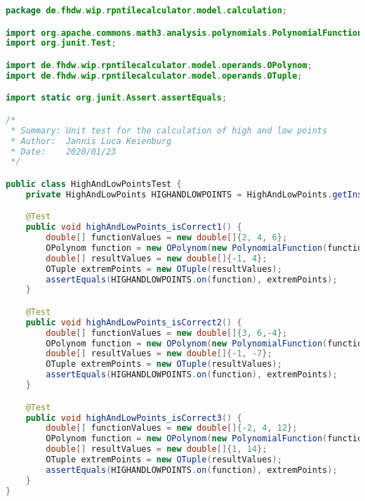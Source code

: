 \begin{lstlisting}[caption=HighAndLowPointsTest (Keienburg),label=list:HighAndLowPointsTest,language=Java]
package de.fhdw.wip.rpntilecalculator.model.calculation;

import org.apache.commons.math3.analysis.polynomials.PolynomialFunction;
import org.junit.Test;

import de.fhdw.wip.rpntilecalculator.model.operands.OPolynom;
import de.fhdw.wip.rpntilecalculator.model.operands.OTuple;

import static org.junit.Assert.assertEquals;

/*
 * Summary: Unit test for the calculation of high and low points
 * Author:  Jannis Luca Keienburg
 * Date:    2020/01/23
 */

public class HighAndLowPointsTest {
    private HighAndLowPoints HIGHANDLOWPOINTS = HighAndLowPoints.getInstance();

    @Test
    public void highAndLowPoints_isCorrect1() {
        double[] functionValues = new double[]{2, 4, 6};
        OPolynom function = new OPolynom(new PolynomialFunction(functionValues));
        double[] resultValues = new double[]{-1, 4};
        OTuple extremPoints = new OTuple(resultValues);
        assertEquals(HIGHANDLOWPOINTS.on(function), extremPoints);
    }

    @Test
    public void highAndLowPoints_isCorrect2() {
        double[] functionValues = new double[]{3, 6,-4};
        OPolynom function = new OPolynom(new PolynomialFunction(functionValues));
        double[] resultValues = new double[]{-1, -7};
        OTuple extremPoints = new OTuple(resultValues);
        assertEquals(HIGHANDLOWPOINTS.on(function), extremPoints);
    }

    @Test
    public void highAndLowPoints_isCorrect3() {
        double[] functionValues = new double[]{-2, 4, 12};
        OPolynom function = new OPolynom(new PolynomialFunction(functionValues));
        double[] resultValues = new double[]{1, 14};
        OTuple extremPoints = new OTuple(resultValues);
        assertEquals(HIGHANDLOWPOINTS.on(function), extremPoints);
    }
}
\end{lstlisting} 

